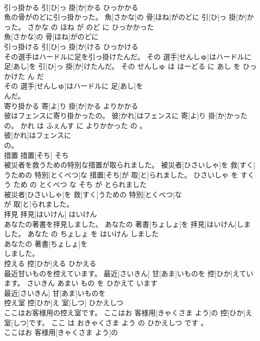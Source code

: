 \documentclass[8pt]{extreport}
\begin{document}
\begin{CJK}{UTF8}{min}
\\	引っ掛かる	引[ひ]っ 掛[か]かる	ひっかかる	
\\	魚の骨がのどに引っ掛かった。	魚[さかな]の 骨[ほね]がのどに 引[ひ]っ 掛[か]かった。	さかな の ほね が のど に ひっかかった	
\\	魚[さかな]の 骨[ほね]がのどに
\\	引っ掛ける	引[ひ]っ 掛[か]ける	ひっかける	
\\	その選手はハードルに足を引っ掛けたんだ。	その 選手[せんしゅ]はハードルに 足[あし]を 引[ひ]っ 掛[か]けたんだ。	その せんしゅ は はーどる に あし を ひっかけた ん だ	
\\	その 選手[せんしゅ]はハードルに 足[あし]を
\\	んだ。			
\\	寄り掛かる	寄[よ]り 掛[か]かる	よりかかる	
\\	彼はフェンスに寄り掛かったの。	彼[かれ]はフェンスに 寄[よ]り 掛[か]かったの。	かれ は ふぇんす に よりかかった の 。	
\\	彼[かれ]はフェンスに
\\	の。			
\\	措置	措置[そち]	そち	
\\	被災者を救うための特別な措置が取られました。	被災者[ひさいしゃ]を 救[すく]うための 特別[とくべつ]な 措置[そち]が 取[と]られました。	ひさいしゃ を すくう ため の とくべつ な そち が とられました	
\\	被災者[ひさいしゃ]を 救[すく]うための 特別[とくべつ]な
\\	が 取[と]られました。			
\\	拝見	拝見[はいけん]	はいけん	
\\	あなたの著書を拝見しました。	あなたの 著書[ちょしょ]を 拝見[はいけん]しました。	あなた の ちょしょ を はいけん しました	
\\	あなたの 著書[ちょしょ]を
\\	しました。			
\\	控える	控[ひか]える	ひかえる	
\\	最近甘いものを控えています。	最近[さいきん] 甘[あま]いものを 控[ひか]えています。	さいきん あまい もの を ひかえて います	
\\	最近[さいきん] 甘[あま]いものを
\\	控え室	控[ひか]え 室[しつ]	ひかえしつ	
\\	ここはお客様用の控え室です。	ここはお 客様用[きゃくさま よう]の 控[ひか]え 室[しつ]です。	ここ は おきゃくさま よう の ひかえしつ です 。	
\\	ここはお 客様用[きゃくさま よう]の

\end{CJK}
\end{document}
